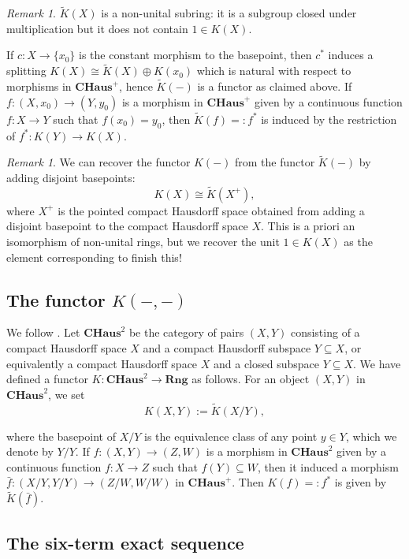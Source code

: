 \documentclass[12pt,a4paper]{amsart}
\theoremstyle{plain}
\theoremstyle{definition}
\theoremstyle{remark}
\newtheorem{rem}[thm]{Remark}
\begin{document}
\begin{rem}
  $\tilde{K}(X)$ is a non-unital subring: it is a subgroup closed under multiplication but it does not contain $1 \in K(X)$.
\end{rem}

If $c \colon X \to \{ x_{0} \}$ is the constant morphism to the basepoint, then $c^{*}$ induces a splitting $K(X) \cong \tilde{K}(X) \oplus K(x_{0})$ which is natural with respect to morphisms in $\mathbf{CHaus}^{+}$, hence $\tilde{K}(-)$ is a functor as claimed above.
If $f \colon (X,x_{0}) \to (Y,y_{0})$ is a morphism in $\mathbf{CHaus}^{+}$ given by a continuous function $f \colon X \to Y$ such that $f(x_{0}) = y_{0}$, then $\tilde{K}(f) =: f^{*}$ is induced by the restriction of $f^{*} \colon K(Y) \to K(X)$.

\begin{rem}
  We can recover the functor $K(-)$ from the functor $\tilde{K}(-)$ by adding disjoint basepoints:
  \[ K(X) \cong \tilde{K}(X^{+}), \]
  where $X^{+}$ is the pointed compact Hausdorff space obtained from adding a disjoint basepoint to the compact Hausdorff space $X$.
  This is a priori an isomorphism of non-unital rings, but we recover the unit $1 \in K(X)$ as the element corresponding to \color{red} finish this! \color{black}
\end{rem}

\subsection{The functor $K(-,-)$}
We follow \cite[p.~66]{ati67}.
Let $\mathbf{CHaus}^{2}$ be the category of pairs $(X,Y)$ consisting of a compact Hausdorff space $X$ and a compact Hausdorff subspace $Y \subseteq X$, or equivalently a compact Hausdorff space $X$ and a closed subspace $Y \subseteq X$.
We have defined a functor $K \colon \mathbf{CHaus}^{2} \to \mathbf{Rng}$ as follows.
For an object $(X,Y)$ in $\mathbf{CHaus}^{2}$, we set
\[ K(X,Y) := \tilde{K}(X/Y), \]

where the basepoint of $X/Y$ is the equivalence class of any point $y \in Y$, which we denote by $Y/Y$.
If $f \colon (X,Y) \to (Z,W)$ is a morphism in $\mathbf{CHaus}^{2}$ given by a continuous function $f \colon X \to Z$ such that $f(Y) \subseteq W$, then it induced a morphism $\bar{f} \colon (X/Y,Y/Y) \to (Z/W, W/W)$ in $\mathbf{CHaus}^{+}$.
Then $K(f) =: f^{*}$ is given by $\tilde{K}(\bar{f})$.

\subsection{The six-term exact sequence}
\end{document}
